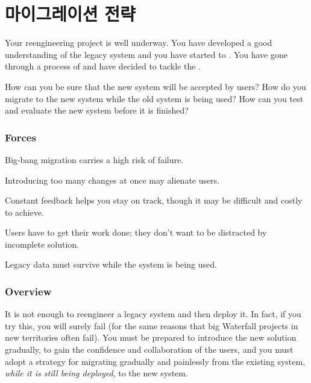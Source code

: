 \documentclass[a4paper,10pt,twoside]{book}
\begin{document}
	\renewcommand{\nnbb}[2]{} %
	\sloppy
\fi
\chapter{마이그레이션 전략}


\label{pat:AlwaysHaveARunningVersion}

Your reengineering project is well underway. You have developed a good understanding of the legacy system and you have started to . You have gone through a process of  and have decided to tackle the .

How can you be sure that the new system will be accepted by users? How do you migrate to the new system while the old system is being used? How can you test and evaluate the new system before it is finished?

\subsection*{Forces}

\begin{bulletlist}
\item Big-bang migration carries a high risk of failure.

\item Introducing too many changes at once may alienate users.

\item Constant feedback helps you stay on track, though it may be difficult and costly to achieve.

\item Users have to get their work done; they don't want to be distracted by incomplete solution.

\item Legacy data must survive while the system is being used.
\end{bulletlist}

\subsection*{Overview}

It is not enough to reengineer a legacy system and then deploy it. In fact, if you try this, you will surely fail (for the same reasons that big Waterfall projects in new territories often fail). You must be prepared to introduce the new solution gradually, to gain the confidence and collaboration of the users, and you must adopt a strategy for migrating gradually and painlessly from the existing system, \emph{while it is still being deployed}, to the new system.
\end{document}
